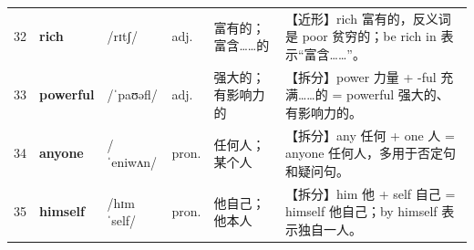 \documentclass[UTF8,a4paper,11pt,oneside]{ctexbook}
\newcommand{\cellword}[1]{{\bfseries\textcolor{wordcol}{#1}}}
\newcommand{\cellipa}[1]{{\footnotesize\textcolor{ipacol}{#1}}}
\newcommand{\cellpos}[1]{\textcolor{poscol}{#1}}
\newcommand{\cellno}[1]{\textcolor{volcolor!75!black}{#1}}
\begin{document}
{\begin{longtable}{@{}C{0.045\textwidth}L{0.155\textwidth}L{0.175\textwidth}C{0.070\textwidth}L{0.180\textwidth}L{0.282\textwidth}@{}}
\cellno{32} & \cellword{rich} & \cellipa{/rɪtʃ/} & \cellpos{adj.} & 富有的；富含……的 & \textcolor{tagNear}{【近形】}rich 富有的，反义词是 poor 贫穷的；be rich in 表示“富含……”。 \\
 \cellno{33} & \cellword{powerful} & \cellipa{/ˈpaʊəfl/} & \cellpos{adj.} & 强大的；有影响力的 & \textcolor{tagSplit}{【拆分】}power 力量 + -ful 充满……的 = powerful 强大的、有影响力的。 \\
\cellno{34} & \cellword{anyone} & \cellipa{/ˈeniwʌn/} & \cellpos{pron.} & 任何人；某个人 & \textcolor{tagSplit}{【拆分】}any 任何 + one 人 = anyone 任何人，多用于否定句和疑问句。 \\
 \cellno{35} & \cellword{himself} & \cellipa{/hɪmˈself/} & \cellpos{pron.} & 他自己；他本人 & \textcolor{tagSplit}{【拆分】}him 他 + self 自己 = himself 他自己；by himself 表示独自一人。 \\
\end{longtable}
}

\end{document}
